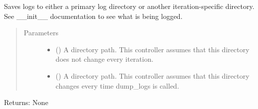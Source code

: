 \documentclass[letterpaper,10pt,english,openany,oneside]{sphinxmanual}
\begin{document}
\begin{fulllineitems}
\begin{fulllineitems}
\begin{quote}
\begin{description}
\end{description}\end{quote}

\end{fulllineitems}


\begin{fulllineitems}
\label{\detokenize{_modules/controllers:controllers.MPC.MPC.changeTargetCost}}
\end{fulllineitems}


\begin{fulllineitems}
\label{\detokenize{_modules/controllers:controllers.MPC.MPC.dump_logs}}
Saves logs to either a primary log directory or another iteration-specific directory.
See \_\_init\_\_ documentation to see what is being logged.
\begin{quote}\begin{description}
\item[{Parameters}] \leavevmode\begin{itemize}
\item {} 
 () \textendash{} A directory path. This controller assumes that this directory
does not change every iteration.

\item {} 
 () \textendash{} A directory path. This controller assumes that this directory
changes every time dump\_logs is called.

\end{itemize}

\end{description}\end{quote}

Returns: None

\end{fulllineitems}



\end{fulllineitems}
\end{document}
